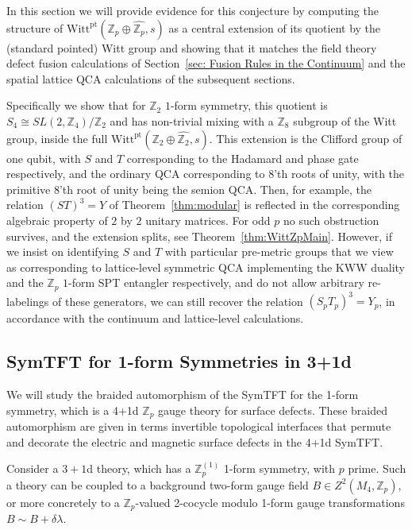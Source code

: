 \documentclass[aps,twocolumn,prx,floatfix,preprintnumbers, nofootinbib,10pt]{revtex4-2}
\numberwithin{equation}{section}
\theoremstyle{definition}
\theoremstyle{remark}
\theoremstyle{claim}
\newcommand{\Z}{{\mathbb Z}}
\newcommand{\Witt}{\text{Witt}}
\newcommand{\pt}{\text{pt}}
\begin{document}
In this section we will provide evidence for this conjecture by computing the structure of $\Witt^\pt(\Z_p\oplus\widehat{\Z_p},s)$ as a central extension of its quotient by the (standard pointed) Witt group and showing that it matches the field theory defect fusion calculations of Section~\ref{sec: Fusion Rules in the Continuum}  and the spatial lattice QCA calculations of the subsequent sections.  

Specifically we show that for $\Z_2$ $1$-form symmetry, this quotient is ${S}_4 \cong SL(2,\Z_4) / \Z_2$ and has non-trivial mixing with a $\Z_8$ subgroup of the Witt group, inside the full 
$\Witt^\pt(\Z_2\oplus\widehat{\Z_2},s)$. 
This extension is the Clifford group of one qubit, with $S$ and $T$ corresponding to the Hadamard and phase gate respectively, and the ordinary QCA corresponding to $8$'th roots of unity, with the primitive $8$'th root of unity being the semion QCA.  Then, for example, the relation $(ST)^3=Y$ of Theorem~\ref{thm:modular} is reflected in the corresponding algebraic property of $2$ by $2$ unitary matrices.  For odd $p$ no such obstruction survives, and the extension splits, see Theorem~\ref{thm:WittZpMain}.  However, if we insist on identifying $S$ and $T$ with particular pre-metric groups that we view as corresponding to lattice-level symmetric QCA implementing the KWW duality and the $\Z_p$ $1$-form SPT entangler respectively, and do not allow arbitrary re-labelings of these generators, we can still recover the relation $(S_p T_p)^3 = Y_p$, in accordance with the continuum and lattice-level calculations.





\subsection{SymTFT for 1-form Symmetries in 3+1d}


We will study the braided 
automorphism of the SymTFT for the 1-form symmetry, which is a 4+1d $\Z_p$ gauge theory for surface defects. These braided automorphism are given in terms invertible topological interfaces that 
permute and decorate  the electric and magnetic surface defects in the 4+1d SymTFT. 

Consider a $3+1$d theory, which has a $\Z_p^{(1)}$ 1-form symmetry, with $p$ prime. 
Such a theory can be coupled to a background two-form gauge field
$B\in Z^2(M_4,\Z_p)$, or more concretely to a $\Z_p$-valued 2-cocycle modulo
1-form gauge transformations $B\sim B+\delta\lambda$.  
\end{document}
